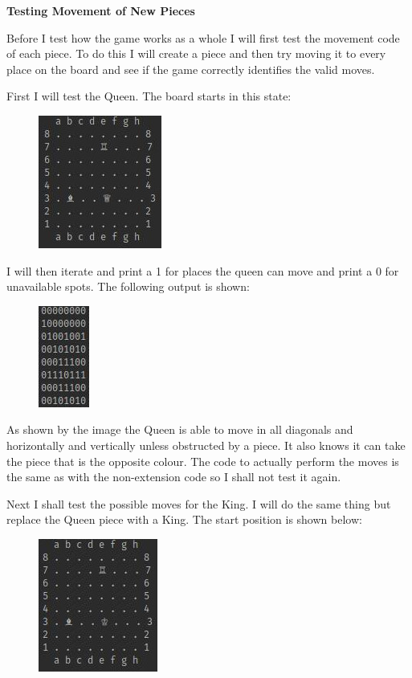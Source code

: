 \documentclass[a4paper]{article}
\begin{document}
\noindent \textbf{Testing Movement of New Pieces}

Before I test how the game works as a whole I will first test the movement code of each piece. To do this I will create a piece and then try moving it to every place on the board and see if the game correctly identifies the valid moves.

First I will test the Queen. The board starts in this state: 
\begin{figure}[H]
\centering
\includegraphics[scale=2.5]{queenStartPos}
\end{figure}

I will then iterate and print a 1 for places the queen can move and print a 0 for unavailable spots. The following output is shown:
\begin{figure}[H]
\centering
\includegraphics[scale=2.5]{queenPosMoves}
\end{figure}
As shown by the image the Queen is able to move in all diagonals and horizontally and vertically unless obstructed by a piece. It also knows it can take the piece that is the opposite colour. The code to actually perform the moves is the same as with the non-extension code so I shall not test it again.

Next I shall test the possible moves for the King. I will do the same thing but replace the Queen piece with a King. The start position is shown below:
\begin{figure}[H]
\centering
\includegraphics[scale=2.5]{kingStartPos}
\end{figure}
\end{document}
